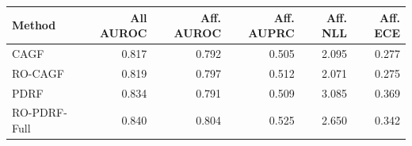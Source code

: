 \begin{tabular}{lrrrrr}
\toprule
Method & All AUROC & Aff. AUROC & Aff. AUPRC & Aff. NLL & Aff. ECE \\
\midrule
CAGF & 0.817 & 0.792 & 0.505 & 2.095 & 0.277 \\
RO-CAGF & 0.819 & 0.797 & 0.512 & 2.071 & 0.275 \\
PDRF & 0.834 & 0.791 & 0.509 & 3.085 & 0.369 \\
RO-PDRF-Full & 0.840 & 0.804 & 0.525 & 2.650 & 0.342 \\
\bottomrule
\end{tabular}